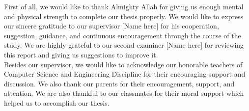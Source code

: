 First of all, we would like to thank Almighty Allah for giving us enough mental and physical strength to complete our thesis properly. We would like to express our sincere gratitude to our supervisor [Name here] for his cooperation, suggestion, guidance, and continuous encouragement through the course of the study. We are highly grateful to our second examiner [Name here] for reviewing this report and giving us suggestions to improve it.\\

Besides our supervisor, we would like to acknowledge our honorable teachers of Computer Science and Engineering Discipline for their encouraging support and discussion. We also thank our parents for their encouragement, support, and attention. We are also thankful to our classmates for their moral support which helped us to accomplish our thesis.